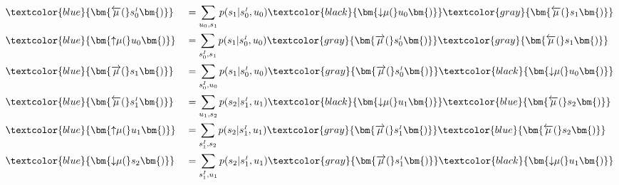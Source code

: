 \noindent
\begin{minipage}[t]{0.5\textwidth}
    \setlength{\abovedisplayskip}{0pt}
    \setlength{\belowdisplayskip}{0pt}
    \begin{alignat}{2}
         & \textcolor{blue}{\bm{\overleftarrow{\mu}(}s^{\scriptscriptstyle I}_0\bm{)}} &  & =  \sum_{u_0,s_1} p(s_1|s^{\scriptscriptstyle I}_0,u_0) \textcolor{black}{\bm{{\downarrow}{\mu}(}u_0\bm{)}} \textcolor{gray}{\bm{\overleftarrow{\mu}(}s_1\bm{)}}                                                \\
         & \textcolor{blue}{\bm{{\uparrow}{\mu}(}u_0\bm{)}}                            &  & = \sum_{s^{\scriptscriptstyle I}_0,s_1} p(s_1|s^{\scriptscriptstyle I}_0,u_0) \textcolor{gray}{\bm{\overrightarrow{\mu}(}s^{\scriptscriptstyle I}_0\bm{)}} \textcolor{gray}{\bm{\overleftarrow{\mu}(}s_1\bm{)}} \\
         & \textcolor{blue}{\bm{\overrightarrow{\mu}(}s_1\bm{)}}                       &  & = \sum_{s^{\scriptscriptstyle I}_0,u_0} p(s_1|s^{\scriptscriptstyle I}_0,u_0) \textcolor{gray}{\bm{\overrightarrow{\mu}(}s^{\scriptscriptstyle I}_0\bm{)}} \textcolor{black}{\bm{{\downarrow}{\mu}(}u_0\bm{)}}  \\
         & \textcolor{blue}{\bm{\overleftarrow{\mu}(}s^{\scriptscriptstyle I}_1\bm{)}} &  & = \sum_{u_1,s_2} p(s_2|s^{\scriptscriptstyle I}_1,u_1) \textcolor{black}{\bm{{\downarrow}{\mu}(}u_1\bm{)}} \textcolor{blue}{\bm{\overleftarrow{\mu}(}s_2\bm{)}}                                                 \\
         & \textcolor{blue}{\bm{{\uparrow}{\mu}(}u_1\bm{)}}                            &  & = \sum_{s^{\scriptscriptstyle I}_1,s_2} p(s_2|s^{\scriptscriptstyle I}_1,u_1) \textcolor{gray}{\bm{\overrightarrow{\mu}(}s^{\scriptscriptstyle I}_1\bm{)}} \textcolor{blue}{\bm{\overleftarrow{\mu}(}s_2\bm{)}} \\
         & \textcolor{blue}{\bm{{\downarrow}{\mu}(}s_2\bm{)}}                          &  & = \sum_{s^{\scriptscriptstyle I}_1,u_1} p(s_2|s^{\scriptscriptstyle I}_1,u_1) \textcolor{gray}{\bm{\overrightarrow{\mu}(}s^{\scriptscriptstyle I}_1\bm{)}} \textcolor{black}{\bm{{\downarrow}{\mu}(}u_1\bm{)}}
    \end{alignat}
\end{minipage}\hfill
